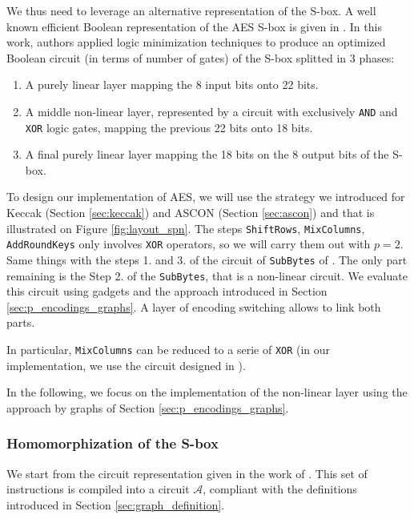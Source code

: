 We thus need to leverage an alternative representation of the \gls{S-box}. A well known efficient Boolean representation of the \gls{AES} \gls{S-box} is given in \cite{boyar}. In this work, authors applied logic minimization techniques to produce an optimized Boolean circuit (in terms of number of gates) of the \gls{S-box} splitted in 3 phases:

\begin{enumerate}
    \item A purely linear layer mapping the 8 input bits onto 22 bits.
    \item A middle non-linear layer, represented by a circuit with exclusively \texttt{AND} and \texttt{XOR} logic gates, mapping the previous 22 bits onto 18 bits.
    \item A final purely linear layer mapping the 18 bits on the 8 output bits of the \gls{S-box}.
\end{enumerate}


To design our implementation of \gls{AES}, we will use the strategy we introduced for Keccak (Section \ref{sec:keccak}) and ASCON (Section \ref{sec:ascon}) and that is illustrated on Figure \ref{fig:layout_spn}. The steps \texttt{ShiftRows}, \texttt{MixColumns}, \texttt{AddRoundKeys} only involves \texttt{XOR} operators, so we will carry them out with $p=2$. Same things with the steps 1. and 3. of the circuit of \texttt{SubBytes} of \cite{boyar}. The only part remaining is the Step 2. of the \texttt{SubBytes}, that is a non-linear circuit. We evaluate this circuit using gadgets and the approach introduced in Section \ref{sec:p_encodings_graphs}. A layer of encoding switching allows to link both parts.

 In particular, \texttt{MixColumns} can be reduced to a serie of \texttt{XOR} (in our implementation, we use the circuit designed in \cite{EPRINT:Maximov19}). 

In the following, we focus on the implementation of the non-linear layer using the approach by graphs of Section \ref{sec:p_encodings_graphs}.


\subsubsection{Homomorphization of the \gls{S-box}}


We start from the circuit representation given in the work of \cite{boyar}. This set of instructions is compiled into a circuit $\mathcal{A}$, compliant with the definitions introduced in Section \ref{sec:graph_definition}.


